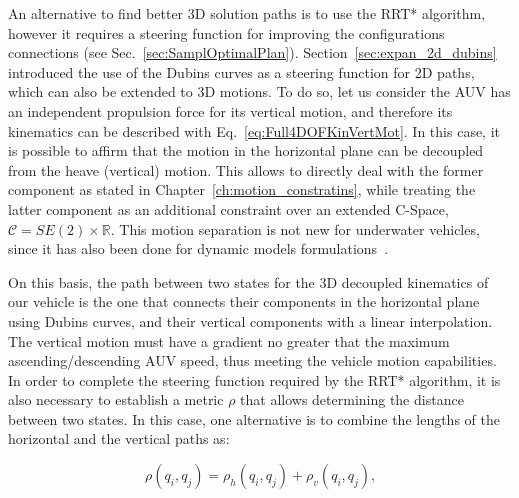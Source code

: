 An alternative to find better \ac{3D} solution paths is to use the \ac{RRT*}
algorithm, however it requires a steering function for improving the
configurations connections (see Sec.~\ref{sec:SamplOptimalPlan}).
Section~\ref{sec:expan_2d_dubins} introduced the use of the Dubins curves as a
steering function for \ac{2D} paths, which can also be extended to
\ac{3D} motions. To do so, let us consider the \ac{AUV} has an independent
propulsion force for its vertical motion, and therefore its kinematics can be
described with Eq.~\eqref{eq:Full4DOFKinVertMot}. In this case, it is possible
to affirm that the motion in the horizontal plane can be decoupled from the
heave (vertical) motion. This allows to directly deal with the former component
as stated in Chapter~\ref{ch:motion_constratins}, while treating the latter
component as an additional constraint over an extended \ac{C-Space},
$\mathcal{C} = SE(2) \times \mathbb{R}$. This motion separation is not new for
underwater vehicles, since it has also been done for dynamic models
formulations~\cite{Miskovic2010}.

On this basis, the path between two states for the \ac{3D} decoupled kinematics
of our vehicle is the one that connects their components in the horizontal plane
using Dubins curves, and their vertical components with a linear interpolation.
The vertical motion must have a gradient no greater that the maximum
ascending/descending \ac{AUV} speed, thus meeting the vehicle motion
capabilities. In order to complete the steering function required by the
\ac{RRT*} algorithm, it is also necessary to establish a metric $\rho$ that
allows determining the distance between two states. In this case, one
alternative is to combine the lengths of the horizontal and the vertical paths
as:


\begin{equation}
\label{eq:CombinedLengthMetric}
	\rho\left( q_i, q_j \right) = \rho_h\left( q_i, q_j \right) + \rho_v\left( q_i,
	q_j \right)
	\text{,}
\end{equation}

